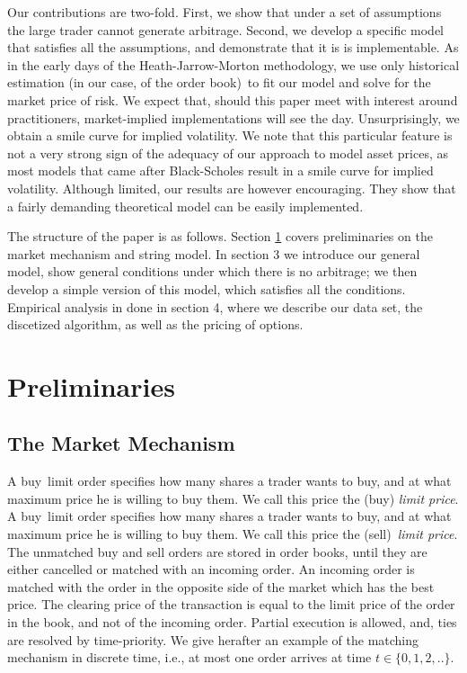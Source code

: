 \documentclass{article}
\begin{document}
Our contributions are two-fold. First, we show that under a set of
assumptions the large trader cannot generate arbitrage. Second, we develop a
specific model that satisfies all the assumptions, and demonstrate that it
is is implementable. As in the early days of the Heath-Jarrow-Morton
methodology, we use only historical estimation (in our case, of the order
book)\ to fit our model and solve for the market price of risk. We expect
that, should this paper meet with interest around practitioners,
market-implied implementations will see the day. Unsurprisingly, we obtain a
smile curve for implied volatility. We note that this particular feature is
not a very strong sign of the adequacy of our approach to model asset
prices, as most models that came after Black-Scholes \cite{BS73} result in a
smile curve for implied volatility. Although limited, our results are
however encouraging. They show that a fairly demanding theoretical model can
be easily implemented.

The structure of the paper is as follows. Section \ref{sec::pre} covers preliminaries on
the market mechanism and string model. In section 3 we introduce our general
model, show general conditions under which there is no arbitrage; we then
develop a simple version of this model, which satisfies all the conditions.
Empirical analysis in done in section 4, where we describe our data set, the
discetized algorithm, as well as the pricing of options.

\section{Preliminaries} \label{sec::pre}

\subsection{The Market Mechanism}

\noindent A buy\ limit order specifies how many shares a trader wants to
buy, and at what maximum price he is willing to buy them. We call this price
the (buy) \textit{limit price}. A buy\ limit order specifies how many shares
a trader wants to buy, and at what maximum price he is willing to buy them.
We call this price the (sell)\ \textit{limit price}. The unmatched buy and
sell orders are stored in order books, until they are either cancelled or
matched with an incoming order. An incoming order is matched with the order
in the opposite side of the market which has the best price. The clearing
price of the transaction is equal to the limit price of the order in the
book, and not of the incoming order. Partial execution is allowed, and, ties
are resolved by time-priority. We give herafter an example of the matching
mechanism in discrete time, i.e., at most one order arrives at time $t\in
\{0,1,2,..\}.$
\end{document}
